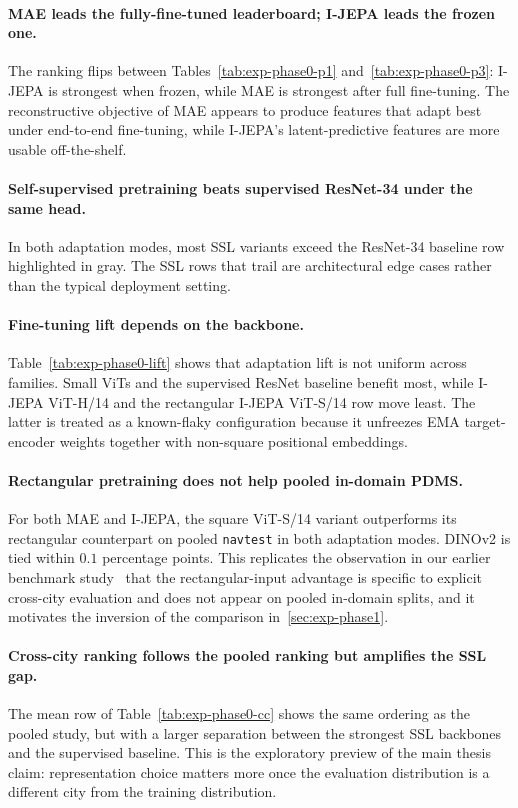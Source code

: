 \paragraph{MAE leads the fully-fine-tuned leaderboard; I-JEPA leads the frozen one.} The ranking flips between Tables~\ref{tab:exp-phase0-p1} and~\ref{tab:exp-phase0-p3}: I-JEPA is strongest when frozen, while MAE is strongest after full fine-tuning. The reconstructive objective of MAE appears to produce features that adapt best under end-to-end fine-tuning, while I-JEPA's latent-predictive features are more usable off-the-shelf.

\paragraph{Self-supervised pretraining beats supervised ResNet-34 under the same head.} In both adaptation modes, most SSL variants exceed the ResNet-34 baseline row highlighted in gray. The SSL rows that trail are architectural edge cases rather than the typical deployment setting.

\paragraph{Fine-tuning lift depends on the backbone.} Table~\ref{tab:exp-phase0-lift} shows that adaptation lift is not uniform across families. Small ViTs and the supervised ResNet baseline benefit most, while I-JEPA ViT-H/14 and the rectangular I-JEPA ViT-S/14 row move least. The latter is treated as a known-flaky configuration because it unfreezes EMA target-encoder weights together with non-square positional embeddings.

\paragraph{Rectangular pretraining does not help pooled in-domain PDMS.} For both MAE and I-JEPA, the square ViT-S/14 variant outperforms its rectangular counterpart on pooled \texttt{navtest} in both adaptation modes. DINOv2 is tied within $0.1$ percentage points. This replicates the observation in our earlier benchmark study~\cite{naeinian-cross-city-2026} that the rectangular-input advantage is specific to explicit cross-city evaluation and does not appear on pooled in-domain splits, and it motivates the inversion of the comparison in~\ref{sec:exp-phase1}.

\paragraph{Cross-city ranking follows the pooled ranking but amplifies the SSL gap.} The mean row of Table~\ref{tab:exp-phase0-cc} shows the same ordering as the pooled study, but with a larger separation between the strongest SSL backbones and the supervised baseline. This is the exploratory preview of the main thesis claim: representation choice matters more once the evaluation distribution is a different city from the training distribution.

